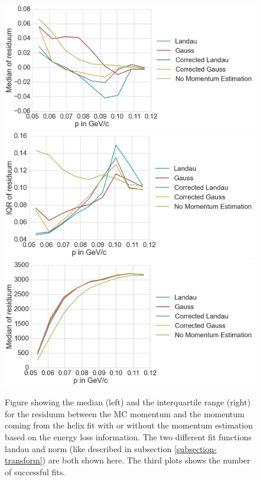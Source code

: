 \begin{figure}
  \centering
  \includegraphics[width=0.48\linewidth]{figures/vxd/kalman0_3Median.png}
  \includegraphics[width=0.48\linewidth]{figures/vxd/kalman0_3IQR.png}
  \includegraphics[width=0.48\linewidth]{figures/vxd/kalman0_3Count.png}
  \caption[Residuum of the momentum estimation for different fit functions.]{Figure showing the median (left) and the interquartile range (right) for the residuum between the MC momentum and the momentum coming from the helix fit with or without the momentum estimation based on the energy loss information. The two different fit functions landau and norm (like described in subsection \ref{subsection-transform}) are both shown here. The third plots shows the number of successful fits.}
  \label{fig-results-fit}
\end{figure}


